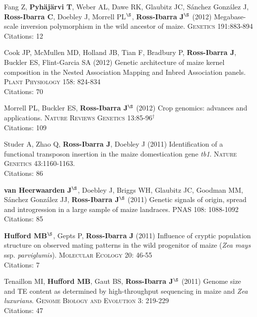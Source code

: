 \documentclass[letterpaper]{article}
\begin{document}
\begin{etaremune}
\item Fang Z, {\bf Pyh\"aj\"arvi T}, Weber AL, Dawe RK, Glaubitz JC, S\'{a}nchez Gonz\'{a}lez J, {\bf Ross-Ibarra C}, Doebley J, Morrell PL$^\S$, {\bf Ross-Ibarra J}$^\S$  (2012) Megabase-scale inversion polymorphism in the wild ancestor of maize. \textsc{Genetics} 191:883-894 
\\Citations: 12\\

\item Cook JP, McMullen MD, Holland JB, Tian F, Bradbury P, {\bf Ross-Ibarra J}, Buckler ES, Flint-Garcia SA (2012) Genetic architecture of maize kernel composition in the Nested Association Mapping and Inbred Association panels.  \textsc{Plant Physiology} 158: 824-834
\\Citations: 70\\

\item Morrell PL, Buckler ES, {\bf Ross-Ibarra J}$^\S$ (2012) Crop genomics: advances and applications.  \textsc{Nature Reviews Genetics} 13:85-96$^\dagger$
\\Citations: 109\\

\item Studer A, Zhao Q, {\bf Ross-Ibarra J}, Doebley J (2011) Identification of a functional transposon insertion in the maize domestication gene \emph{tb1}.  \textsc{Nature Genetics} 43:1160-1163.
\\Citations: 86\\

\item {\bf van Heerwaarden J}$^\S$, Doebley J, Briggs WH, Glaubitz JC, Goodman MM, S\'{a}nchez Gonz\'{a}lez JJ, {\bf Ross-Ibarra J}$^\S$ (2011) Genetic signals of origin, spread and introgression in a large sample of maize landraces. PNAS 108: 1088-1092
\\Citations: 85\\

\item {\bf Hufford MB}$^\S$, Gepts P, {\bf Ross-Ibarra J} (2011) Influence of cryptic population structure on observed mating patterns in the wild progenitor of maize (\emph{Zea mays} ssp. \emph{parviglumis}).  \textsc{Molecular Ecology} 20: 46-55
\\Citations: 7\\

\item Tenaillon MI, {\bf Hufford MB}, Gaut BS, {\bf Ross-Ibarra J}$^\S$ (2011)  Genome size and TE content as determined by high-throughput sequencing in maize and \emph{Zea luxurians}.  \textsc{Genome Biology and Evolution } 3: 219-229
\\Citations: 47\\


\end{etaremune}
\end{document}
